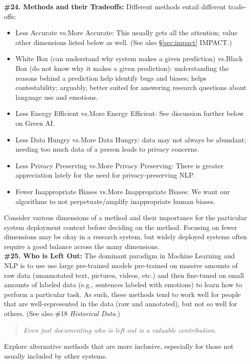 \documentclass{clv3}
\begin{document}
\noindent \textbf{\#24. Methods and their Tradeoffs:} Different methods entail different trade-offs:\\[-20pt]
\begin{itemize}
    \item Less Accurate vs.\@ More Accurate: This usually gets all the attention; value other dimensions listed below as well. (See also \S \ref{sec:impact} IMPACT.)
    \vspace*{-1mm}
    \item White Box (can understand why system makes a given prediction) vs.\@ Black Box (do not know why it makes a given prediction): understanding the reasons behind a prediction help identify bugs and biases; helps contestability; arguably, better suited for answering research questions about language use and emotions.
    \vspace*{-1mm}
    \item Less Energy Efficient vs.\@ More Energy Efficient: See discussion further below on Green AI.
    \vspace*{-1mm}
    \item Less Data Hungry vs.\@ More Data Hungry: data may not always be abundant; needing too much data of a person leads to privacy concerns.
    \vspace*{-1mm}
    \item Less Privacy Preserving vs.\@ More Privacy Preserving: There is greater appreciation lately for the need for privacy-preserving NLP. %
    \vspace*{-1mm}
    \item Fewer Inappropriate Biases vs.\@ More Inappropriate Biases: We want our algorithms to not perpetuate/amplify inappropriate human biases.
\end{itemize}
\vspace*{-2mm}
\noindent Consider various dimensions of a method and their importance for the particular system deployment context before deciding on the method. Focusing on fewer dimensions may be okay in a research system, but widely deployed systems often require a good balance across the many dimensions.\\

\noindent \textbf{\#25. Who is Left Out:} The dominant paradigm in Machine Learning and NLP is to use use large pre-trained models pre-trained on massive amounts of raw data (unannotated text, pictures, videos, etc.) and then fine-tuned on small amounts of labeled data (e.g., sentences labeled with emotions) to learn how to perform a particular task. As such, these methods tend to work well for people that are well-represented in the data (raw and annotated), but not so well for others. (See also \#18 \textit{Historical Data}.)\\[-20pt]
\begin{quote}
\textit{Even just documenting who is left out is a valuable contribution.} 
\end{quote}
\vspace*{-3mm}
Explore alternative methods that are more inclusive, especially for those not usually included by other systems.\\
\end{document}
